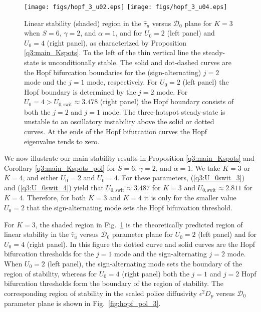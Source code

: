 \documentclass{article}%
\begin{document}
\begin{figure}[htbp]
\centering
\texttt{[image: figs/hopf\_3\_u02.eps]}
\texttt{[image: figs/hopf\_3\_u04.eps]}
\caption{\label{fig:hopf_tau_3} Linear stability (shaded) region in
  the $\hat{\tau}_u$ versus ${\mathcal D}_0$ plane for $K=3$ when
  $S=6$, $\gamma=2$, and $\alpha=1$, and for $U_0=2$ (left panel) and
  $U_{0}=4$ (right panel), as characterized by Proposition
  \ref{q3:main_Kspots}. To the left of the thin vertical line the
  steady-state is unconditionally stable. The solid and dot-dashed curves
  are the Hopf bifurcation boundaries for the (sign-alternating) $j=2$
  mode and the $j=1$ mode, respectively. For $U_0=2$ (left panel) the
  Hopf boundary is determined by the $j=2$ mode.  For
  $U_0=4>U_{0,\textrm{swit}}\approx 3.478$ (right panel) the Hopf
  boundary consists of both the $j=2$ and $j=1$ mode. The
  three-hotspot steady-state is unstable to an oscillatory instability
  above the solid or dotted curves. At the ends of the Hopf
  bifurcation curves the Hopf eigenvalue tends to zero.}
\end{figure}


We now illustrate our main stability results in Proposition
\ref{q3:main_Kspots} and Corollary \ref{q3:main_Kspots_pol} for 
$S=6$, $\gamma=2$, and $\alpha=1$. We take $K=3$ or $K=4$, and either
$U_0=2$ and $U_0=4$. For these parameters, (\ref{q3:U_0swit_3}) and
(\ref{q3:U_0swit_4}) yield that $U_{0,\textrm{swit}}\approx 3.487$ for
$K=3$ and $U_{0,\textrm{swit}}\approx 2.811$ for $K=4$. Therefore, for
both $K=3$ and $K=4$ it is only for the smaller value $U_0=2$ that the
sign-alternating mode sets the Hopf bifurcation threshold.

For $K=3$, the shaded region in Fig.~\ref{fig:hopf_tau_3} is the
theoretically predicted region of linear stability in the
$\hat{\tau}_u$ versus ${\mathcal D}_0$ parameter plane for $U_0=2$
(left panel) and for $U_0=4$ (right panel). In this figure the dotted
curve and solid curves are the Hopf bifurcation thresholds for the
$j=1$ mode and the sign-alternating $j=2$ mode. When $U_0=2$ (left
panel), the sign-alternating mode sets the boundary of the region of
stability, whereas for $U_0=4$ (right panel) both the $j=1$ and $j=2$
Hopf bifurcation thresholds form the boundary of the region of
stability. The corresponding region of stability in the scaled police
diffusivity $\epsilon^2 D_p$ versus ${\mathcal D}_0$ parameter plane
is shown in Fig.~\ref{fig:hopf_pol_3}.
\end{document}
